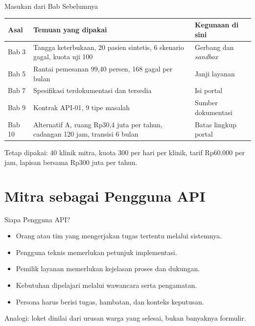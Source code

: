 \documentclass[aspectratio=169, table, 12pt]{beamer}
\begin{document}
\begin{frame}{{\Large Masukan dari Bab Sebelumnya}}
  \footnotesize
  \begin{tabularx}{\textwidth}{>{\raggedright\arraybackslash}p{1.3cm} >{\raggedright\arraybackslash}X >{\raggedright\arraybackslash}p{4.6cm}}
    \hline
    \textbf{Asal} & \textbf{Temuan yang dipakai} & \textbf{Kegunaan di sini} \\ \hline
    Bab 3 & Tangga keterbukaan, 20 pasien sintetis, 6 skenario gagal, kuota uji 100 & Gerbang dan \textit{sandbox} \\ \hline
    Bab 5 & Rantai pemesanan 99,40 persen, 168 gagal per bulan & Janji layanan \\ \hline
    Bab 7 & Spesifikasi terdokumentasi dan tersedia & Isi portal \\ \hline
    Bab 9 & Kontrak API-01, 9 tipe masalah & Sumber dokumentasi \\ \hline
    Bab 10 & Alternatif A, ruang Rp30,4 juta per tahun, cadangan 120 jam, transisi 6 bulan & Batas lingkup portal \\ \hline
  \end{tabularx}

  \vspace{8pt}
  \small Tetap dipakai: 40 klinik mitra, kuota 300 per hari per klinik, tarif Rp60.000 per jam, lapisan bersama Rp300 juta per tahun.
\end{frame}

\section{Mitra sebagai Pengguna API}

\begin{frame}{{\Large Siapa Pengguna API?}}
  \vspace{8pt}
  \begin{itemize}
    \item Orang atau tim yang mengerjakan tugas tertentu melalui sistemnya.
    \item Pengguna teknis memerlukan petunjuk implementasi.
    \item Pemilik layanan memerlukan kejelasan proses dan dukungan.
    \item Kebutuhan dipelajari melalui wawancara serta pengamatan.
    \item Persona harus berisi tugas, hambatan, dan konteks keputusan.
  \end{itemize}
  \vspace{6pt}
  {\small Analogi: loket dinilai dari urusan warga yang selesai, bukan banyaknya formulir.}
\end{frame}
\end{document}
